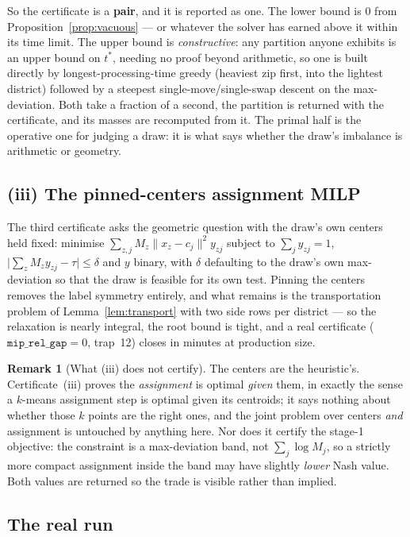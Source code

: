 \documentclass[11pt]{article}
\theoremstyle{definition}
\newtheorem{remark}{Remark}
\begin{document}
So the certificate is a \textbf{pair}, and it is reported as one. The lower bound is $0$ from
Proposition~\ref{prop:vacuous} --- or whatever the solver has earned above it within its time
limit. The upper bound is \emph{constructive}: any partition anyone exhibits is an upper
bound on $t^\ast$, needing no proof beyond arithmetic, so one is built directly by
longest-processing-time greedy (heaviest zip first, into the lightest district) followed by a
steepest single-move/single-swap descent on the max-deviation. Both take a fraction of a
second, the partition is returned with the certificate, and its masses are recomputed from
it. The primal half is the operative one for judging a draw: it is what says whether the
draw's imbalance is arithmetic or geometry.

\subsection{(iii) The pinned-centers assignment MILP}

The third certificate asks the geometric question with the draw's own centers held fixed:
minimise $\sum_{z,j} M_z\lVert x_z-c_j\rVert^2 y_{zj}$ subject to
$\sum_j y_{zj}=1$, $\lvert\sum_z M_z y_{zj}-\tau\rvert\le\delta$ and $y$ binary, with
$\delta$ defaulting to the draw's own max-deviation so that the draw is feasible for its own
test. Pinning the centers removes the label symmetry entirely, and what remains is the
transportation problem of Lemma~\ref{lem:transport} with two side rows per district --- so
the relaxation is nearly integral, the root bound is tight, and a real certificate
($\texttt{mip\_rel\_gap}=0$, trap~12) closes in minutes at production size.

\begin{remark}[What (iii) does not certify]\label{rem:notcert}
The centers are the heuristic's. Certificate~(iii) proves the \emph{assignment} is optimal
\emph{given} them, in exactly the sense a $k$-means assignment step is optimal given its
centroids; it says nothing about whether those $k$ points are the right ones, and the joint
problem over centers \emph{and} assignment is untouched by anything here. Nor does it
certify the stage-1 objective: the constraint is a max-deviation band, not
$\sum_j\log M_j$, so a strictly more compact assignment inside the band may have slightly
\emph{lower} Nash value. Both values are returned so the trade is visible rather than
implied.
\end{remark}

\subsection{The real run}\label{sec:run}
\end{document}
